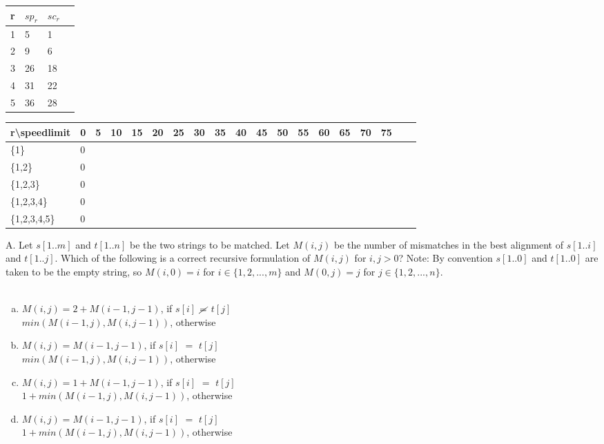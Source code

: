 \documentclass[12pt]{article}
\begin{document}
\begin{table}[]
    \begin{tabular}{|l|l|l|l|}
    \hline
    r & $sp_r$ & $sc_r$ \\ \hline
    1 & 5    & 1    \\ \hline
    2 & 9    & 6    \\ \hline
    3 & 26    & 18    \\ \hline
    4 & 31    & 22    \\ \hline
    5 & 36    & 28    \\ \hline
    \end{tabular}
    \end{table}
    \FloatBarrier
    \begin{table}[]
        \begin{tabular}{|l|l|l|l|l|l|l|l|l|l|l|l|l|l|l|l|l|l|l|}
        \hline
        r\textbackslash{}speedlimit & 0 & 5 & 10 & 15 & 20 & 25 & 30  & 35 & 40 & 45 & 50 & 55 & 60 & 65 & 70 & 75 \\ \hline
        \{1\}                  & 0 &   &   &   &   &   &    &   &   &   &    &    &    &    &    &  \\ \hline
        \{1,2\}                  & 0 &   &   &   &   &   &    &   &   &   &    &    &    &    &    &     \\ \hline
        \{1,2,3\}                  & 0 &   &   &   &   &   &    &   &   &   &    &    &    &    &    &    \\ \hline
        \{1,2,3,4\}                  & 0 &   &   &   &   &   &    &   &   &   &    &    &    &    &    &      \\ \hline
        \{1,2,3,4,5\}                  & 0 &   &   &   &   &   &    &   &   &   &    &    &    &    &    &     \\ \hline
        \end{tabular}
        \end{table}
        \FloatBarrier
\newpage
\noindent A. Let $s[1..m]$ and $t[1..n]$ be the two strings to be matched. 
Let $M(i,j)$ be the number of mismatches in the best alignment of $s[1..i]$ 
and $t[1..j]$. Which of the following is a correct recursive formulation 
of $M(i,j)$ for $i,j > 0$? Note: By convention $s[1..0]$ and $t[1..0]$ are taken 
to be the empty string, so $M(i, 0) = i$ for $i \in \{1,2,...,m\}$ and $M(0,j) = j$ 
for $j \in \{1,2,...,n\}$.\\\\
\begin{enumerate}[a)]
    \item $M(i,j) = 2+M(i-1,j-1)$, if $s[i]$ $\cancel{=}$ $t[j]$\\
    $min(M(i-1,j),M(i,j-1))$, otherwise
    \item $M(i,j) = M(i-1,j-1)$, if $s[i]$ $=$ $t[j]$\\
    $min(M(i-1,j),M(i,j-1))$, otherwise
    \item $M(i,j) = 1+M(i-1,j-1)$, if $s[i]$ $=$ $t[j]$\\
    $1+min(M(i-1,j),M(i,j-1))$, otherwise
    \item $M(i,j) = M(i-1,j-1)$, if $s[i]$ $=$ $t[j]$\\
    $1+min(M(i-1,j),M(i,j-1))$, otherwise
\end{enumerate}
\end{document}
